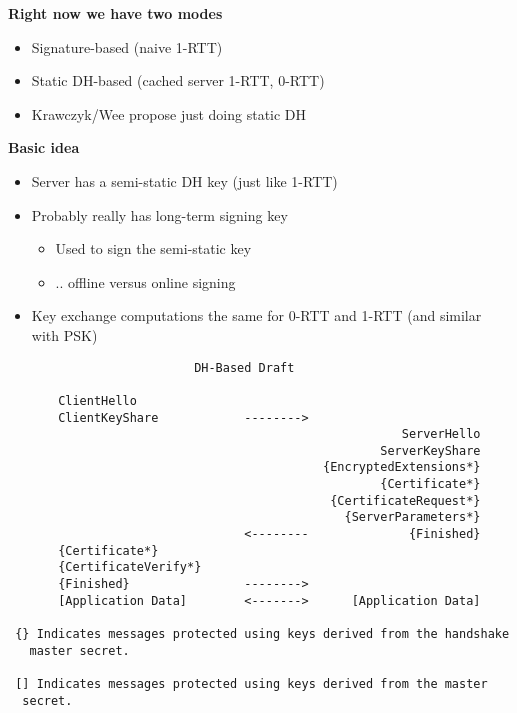 \documentclass[helvetica]{seminar}
\newcommand{\heading}[1]{%
  \begin{center} 
    \large\bf 
    #1 
  \end{center} 
  \vspace{.4 in}}
\begin{document}
\begin{slide}
\heading{Right now we have two modes}

\begin{itemize}
\item Signature-based (naive 1-RTT)
\item Static DH-based (cached server 1-RTT, 0-RTT)
\item Krawczyk/Wee propose just doing static DH
\end{itemize}
\end{slide}


\begin{slide}
\heading{Basic idea}

\begin{itemize}
\item Server has a semi-static DH key (just like 1-RTT)
\item Probably really has long-term signing key
  \begin{itemize}
  \item Used to sign the semi-static key
  \item .. offline versus online signing
  \end{itemize}

\item Key exchange computations the same for 0-RTT and 1-RTT (and similar with PSK)
\end{itemize}

\end{slide}


\begin{slide}
\begin{footnotesize}
\begin{verbatim}
                          DH-Based Draft

       ClientHello
       ClientKeyShare            -------->
                                                       ServerHello
                                                    ServerKeyShare
                                            {EncryptedExtensions*}
                                                    {Certificate*}
                                             {CertificateRequest*}
                                               {ServerParameters*}
                                 <--------              {Finished}
       {Certificate*}
       {CertificateVerify*}
       {Finished}                -------->
       [Application Data]        <------->      [Application Data]

 {} Indicates messages protected using keys derived from the handshake
   master secret.

 [] Indicates messages protected using keys derived from the master
  secret.
\end{verbatim}
\end{footnotesize}
\end{slide}
\end{document}
